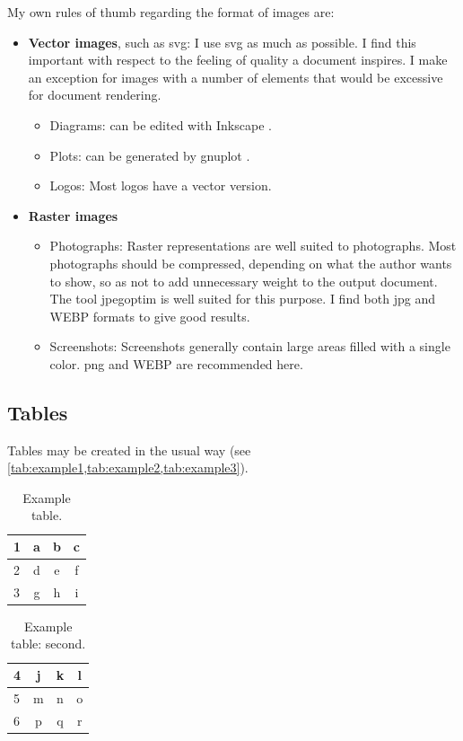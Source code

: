 My own rules of thumb regarding the format of images are:
\begin{itemize}
\item \textbf{Vector images}, such as \gls{svg}: I use \gls{svg} as much
as possible. I find this important with respect to the feeling of quality
a document inspires. I make an exception for images with a number of elements
that would be excessive for document rendering.
\begin{itemize}
\item Diagrams: can be edited with Inkscape \cite{inkscape}.
\item Plots: can be generated by gnuplot \cite{gnuplot}.
\item Logos: Most logos have a vector version.
\end{itemize}
\item \textbf{Raster images}
\begin{itemize}
\item Photographs: Raster representations are well suited to photographs.
      Most photographs should be compressed, depending on what the author
      wants to show, so as not to add unnecessary weight to the output document.
      The tool jpegoptim \cite{tjko/jpegoptim} is well suited for this purpose.
      I find both \gls{jpg} and WEBP formats to give good results.
\item Screenshots: Screenshots generally contain large areas filled with a
      single color. \gls{png} and WEBP are recommended here.
\end{itemize}
\end{itemize}

\subsection{Tables}
Tables may be created in the usual way (see
\cref{tab:example1,tab:example2,tab:example3}).

\begin{table} \caption{\label{tab:example1} Example table.}
\begin{tabular}{l | c c c} \hline
1 & a & b & c \\ \hline
2 & d & e & f \\ \hline
3 & g & h & i \\
\hline \end{tabular}
\end{table}

\begin{table} \caption{\label{tab:example2} Example table: second.}
\begin{tabular}{l | c c c} \hline
4 & j & k & l \\ \hline
5 & m & n & o \\ \hline
6 & p & q & r \\
\hline \end{tabular}
\end{table}

